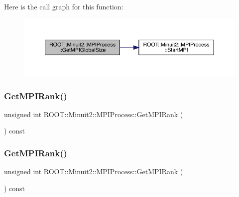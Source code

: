 Here is the call graph for this function\+:
\nopagebreak
\begin{figure}[H]
\begin{center}
\leavevmode
\includegraphics[width=350pt]{dc/d43/classROOT_1_1Minuit2_1_1MPIProcess_acfa3106122ad8f8c7d6bb3777c3d1ccc_cgraph}
\end{center}
\end{figure}
\mbox{\label{classROOT_1_1Minuit2_1_1MPIProcess_a86c50a55e3ae2651b74fa18443a13dd3}} 
\subsubsection{\texorpdfstring{GetMPIRank()}{GetMPIRank()}\hspace{0.1cm}{\footnotesize\ttfamily [1/2]}}
{\footnotesize\ttfamily unsigned int R\+O\+O\+T\+::\+Minuit2\+::\+M\+P\+I\+Process\+::\+Get\+M\+P\+I\+Rank (\begin{DoxyParamCaption}{ }\end{DoxyParamCaption}) const\hspace{0.3cm}{\ttfamily [inline]}}

\mbox{\label{classROOT_1_1Minuit2_1_1MPIProcess_a86c50a55e3ae2651b74fa18443a13dd3}} 
\subsubsection{\texorpdfstring{GetMPIRank()}{GetMPIRank()}\hspace{0.1cm}{\footnotesize\ttfamily [2/2]}}
{\footnotesize\ttfamily unsigned int R\+O\+O\+T\+::\+Minuit2\+::\+M\+P\+I\+Process\+::\+Get\+M\+P\+I\+Rank (\begin{DoxyParamCaption}{ }\end{DoxyParamCaption}) const\hspace{0.3cm}{\ttfamily [inline]}}

